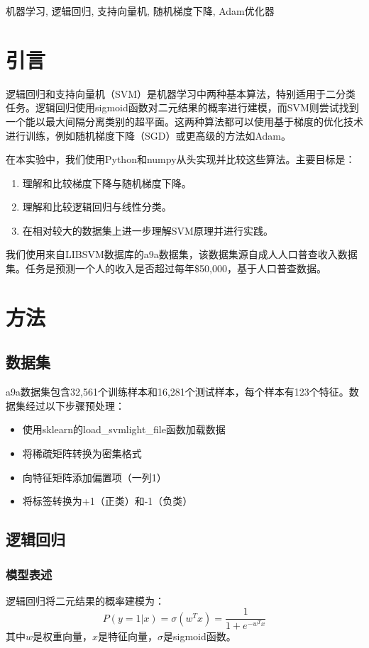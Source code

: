 \documentclass[journal, a4paper]{IEEEtran}
\begin{document}
\begin{CJK}{UTF8}{gbsn}
\begin{IEEEkeywords}
机器学习, 逻辑回归, 支持向量机, 随机梯度下降, Adam优化器
\end{IEEEkeywords}

\section{引言}
逻辑回归和支持向量机（SVM）是机器学习中两种基本算法，特别适用于二分类任务。逻辑回归使用sigmoid函数对二元结果的概率进行建模，而SVM则尝试找到一个能以最大间隔分离类别的超平面。这两种算法都可以使用基于梯度的优化技术进行训练，例如随机梯度下降（SGD）或更高级的方法如Adam。

在本实验中，我们使用Python和numpy从头实现并比较这些算法。主要目标是：

\begin{enumerate}
    \item 理解和比较梯度下降与随机梯度下降。
    \item 理解和比较逻辑回归与线性分类。
    \item 在相对较大的数据集上进一步理解SVM原理并进行实践。
\end{enumerate}

我们使用来自LIBSVM数据库的a9a数据集，该数据集源自成人人口普查收入数据集。任务是预测一个人的收入是否超过每年\$50,000，基于人口普查数据。

\section{方法}
\subsection{数据集}
a9a数据集包含32,561个训练样本和16,281个测试样本，每个样本有123个特征。数据集经过以下步骤预处理：

\begin{itemize}
    \item 使用sklearn的load\_svmlight\_file函数加载数据
    \item 将稀疏矩阵转换为密集格式
    \item 向特征矩阵添加偏置项（一列1）
    \item 将标签转换为+1（正类）和-1（负类）
\end{itemize}

\subsection{逻辑回归}
\subsubsection{模型表述}
逻辑回归将二元结果的概率建模为：
\begin{equation}
P(y=1|x) = \sigma(w^T x) = \frac{1}{1 + e^{-w^T x}}
\end{equation}
其中$w$是权重向量，$x$是特征向量，$\sigma$是sigmoid函数。


\end{CJK}
\end{document}
